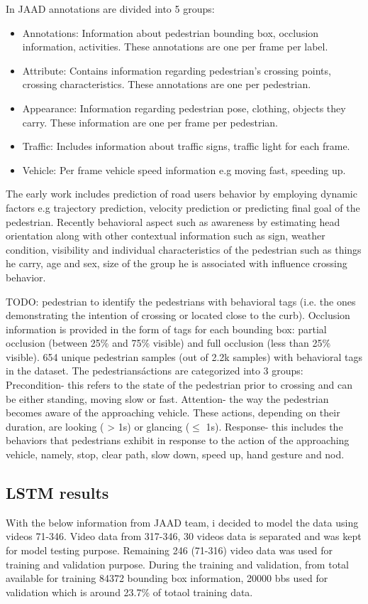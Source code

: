In JAAD annotations are divided into 5 groups:
\begin{itemize}
	\item Annotations: Information about pedestrian bounding box, occlusion information, activities. These annotations are one per frame per label.
	\item Attribute: Contains information regarding pedestrian's crossing points, crossing characteristics. These annotations are one per pedestrian.
	\item Appearance: Information regarding pedestrian pose, clothing, objects they carry. These information are one per frame per pedestrian.
	\item Traffic: Includes information about traffic signs, traffic light for each frame.
	\item Vehicle: Per frame vehicle speed information e.g moving fast, speeding up.
\end{itemize}


The early work includes prediction of road users behavior by employing dynamic factors e.g trajectory prediction, velocity prediction or predicting final goal of the pedestrian. Recently behavioral aspect such as awareness by estimating head orientation along with other contextual information such as sign, weather condition, visibility and individual characteristics of the pedestrian such as things he carry, age and sex, size of the group he is associated with influence crossing behavior.

TODO:  pedestrian to identify the pedestrians with behavioral tags (i.e. the ones demonstrating the intention of crossing or located close to the curb). 
Occlusion information is provided in the form of tags for
each bounding box: partial occlusion (between 25\% and 75\%
visible) and full occlusion (less than 25\% visible).
 654 unique pedestrian samples (out of 2.2k samples) with behavioral tags in the
dataset. 
The
pedestrians\' actions are categorized into 3 groups: Precondition- this refers to the state of the pedestrian prior to crossing and can be either standing, moving slow or fast. Attention- the way the pedestrian becomes aware of the approaching vehicle. These actions, depending on their duration, are looking ( > 1s) or glancing ($\leq$ 1s). Response- this
includes the behaviors that pedestrians exhibit in response
to the action of the approaching vehicle, namely, stop, clear path, slow down, speed up, hand gesture and nod.

\subsection{LSTM results}
With the below information from JAAD team, i decided to model the data using videos 71-346.
Video data from 317-346, 30 videos data is separated and was kept for model testing purpose.
Remaining 246 (71-316) video data was used for training and validation purpose.
During the training and validation, from total available for training 84372 bounding box information, 20000 bbs used for validation which is around 23.7\% of totaol training data.

